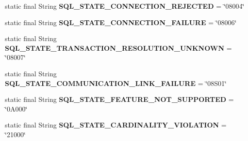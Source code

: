 \begin{DoxyCompactItemize}
\item 
\mbox{\label{classcom_1_1mysql_1_1cj_1_1exceptions_1_1_mysql_error_numbers_a1e7bc7c07c1a36b1cfa4796611091e82}} 
static final String {\bfseries S\+Q\+L\+\_\+\+S\+T\+A\+T\+E\+\_\+\+C\+O\+N\+N\+E\+C\+T\+I\+O\+N\+\_\+\+R\+E\+J\+E\+C\+T\+ED} = \char`\"{}08004\char`\"{}
\item 
\mbox{\label{classcom_1_1mysql_1_1cj_1_1exceptions_1_1_mysql_error_numbers_a01a0deb2b6b9ccda3aa6d6a89ae17090}} 
static final String {\bfseries S\+Q\+L\+\_\+\+S\+T\+A\+T\+E\+\_\+\+C\+O\+N\+N\+E\+C\+T\+I\+O\+N\+\_\+\+F\+A\+I\+L\+U\+RE} = \char`\"{}08006\char`\"{}
\item 
\mbox{\label{classcom_1_1mysql_1_1cj_1_1exceptions_1_1_mysql_error_numbers_aa8958e27978fae68974fe664da2d16a8}} 
static final String {\bfseries S\+Q\+L\+\_\+\+S\+T\+A\+T\+E\+\_\+\+T\+R\+A\+N\+S\+A\+C\+T\+I\+O\+N\+\_\+\+R\+E\+S\+O\+L\+U\+T\+I\+O\+N\+\_\+\+U\+N\+K\+N\+O\+WN} = \char`\"{}08007\char`\"{}
\item 
\mbox{\label{classcom_1_1mysql_1_1cj_1_1exceptions_1_1_mysql_error_numbers_a67f3a559bd95eb3293948c42df3f052f}} 
static final String {\bfseries S\+Q\+L\+\_\+\+S\+T\+A\+T\+E\+\_\+\+C\+O\+M\+M\+U\+N\+I\+C\+A\+T\+I\+O\+N\+\_\+\+L\+I\+N\+K\+\_\+\+F\+A\+I\+L\+U\+RE} = \char`\"{}08\+S01\char`\"{}
\item 
\mbox{\label{classcom_1_1mysql_1_1cj_1_1exceptions_1_1_mysql_error_numbers_ad523c5e008cab066c21d03d124547a03}} 
static final String {\bfseries S\+Q\+L\+\_\+\+S\+T\+A\+T\+E\+\_\+\+F\+E\+A\+T\+U\+R\+E\+\_\+\+N\+O\+T\+\_\+\+S\+U\+P\+P\+O\+R\+T\+ED} = \char`\"{}0\+A000\char`\"{}
\item 
\mbox{\label{classcom_1_1mysql_1_1cj_1_1exceptions_1_1_mysql_error_numbers_a5fdb71708253577ec65a3bd9d56ee092}} 
static final String {\bfseries S\+Q\+L\+\_\+\+S\+T\+A\+T\+E\+\_\+\+C\+A\+R\+D\+I\+N\+A\+L\+I\+T\+Y\+\_\+\+V\+I\+O\+L\+A\+T\+I\+ON} = \char`\"{}21000\char`\"{}

\end{DoxyCompactItemize}
